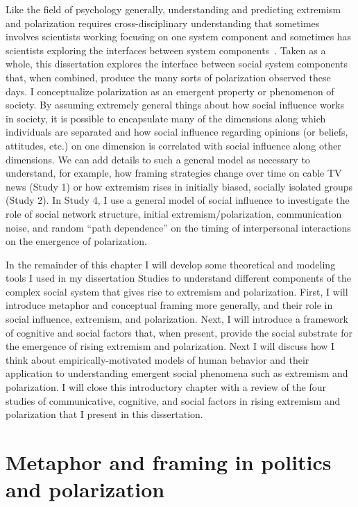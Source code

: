 \documentclass[12pt,letterpaper]{article}
\begin{document}
Like the field of psychology generally, understanding and predicting extremism
and polarization requires cross-disciplinary understanding that sometimes
involves scientists working focusing on one system component and sometimes has 
scientists exploring the interfaces between system components~\cite{Brewer2013,Rollwage2019}.
Taken as a whole, this dissertation explores the interface between social
system components that, when combined, produce the many sorts of polarization
observed these days.  I conceptualize polarization as an emergent property or phenomenon of society. By assuming
extremely general things about how social influence works in society, it is
possible to encapsulate many of the dimensions along which individuals are
separated and how social influence regarding opinions (or beliefs, attitudes, etc.) on one dimension
is correlated with social influence along other dimensions. We can add 
details to such a general model as necessary to understand, for example, 
how framing strategies change over time on cable TV news (Study 1) or how
extremism rises in initially biased, socially isolated groups (Study 2). 
In Study 4, I use a general model of social influence to 
investigate the role of social network structure, initial extremism/polarization,
communication noise, and random ``path dependence'' on the timing of 
interpersonal interactions on the emergence of polarization.

In the remainder of this chapter I will develop some theoretical and modeling
tools I used in my dissertation Studies to understand different components
of the complex social system that gives rise to extremism and polarization.
First, I will introduce metaphor and conceptual framing more generally, and
their role in social influence, extremism, and polarization. Next, I will
introduce a framework of cognitive and social factors that, when present,
provide the social substrate for the emergence of rising extremism and polarization.
Next I will discuss how I think about empirically-motivated models of human 
behavior and their application to understanding emergent social phenomena
such as extremism and polarization. I will close this introductory chapter with
a review of the four studies of communicative, cognitive, and social factors
in rising extremism and polarization that I present in this dissertation.


\section{Metaphor and framing in politics and polarization}
\end{document}
